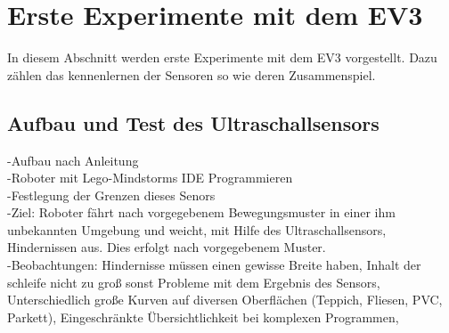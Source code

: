 \chapter{Erste Experimente mit dem EV3}
In diesem Abschnitt werden erste Experimente mit dem EV3 vorgestellt. Dazu zählen das kennenlernen der Sensoren so wie deren Zusammenspiel. 
\section{Aufbau und Test des Ultraschallsensors}
-Aufbau nach Anleitung\\
-Roboter mit Lego-Mindstorms IDE Programmieren \\
-Festlegung der Grenzen dieses Senors\\
-Ziel: Roboter fährt nach vorgegebenem Bewegungsmuster in einer ihm unbekannten Umgebung und weicht, mit Hilfe des Ultraschallsensors, Hindernissen aus. Dies erfolgt nach vorgegebenem Muster.\\ 
-Beobachtungen: Hindernisse müssen einen gewisse Breite haben, Inhalt der schleife nicht zu groß sonst Probleme mit dem Ergebnis des Sensors, Unterschiedlich große Kurven auf diversen Oberflächen (Teppich, Fliesen, PVC, Parkett), Eingeschränkte Übersichtlichkeit bei komplexen Programmen, \\